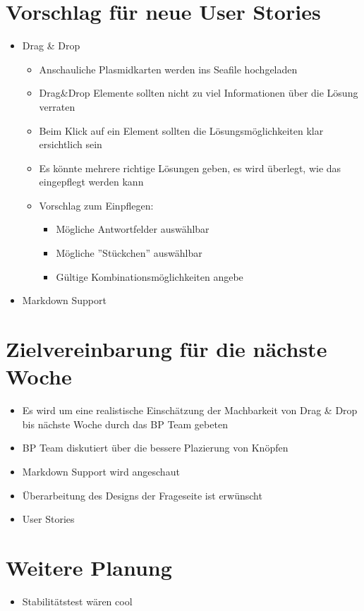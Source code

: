 \documentclass[colorback, accentcolor=tud1c, paper=a4]{tudexercise}
\begin{document}
\begin{multicols}{2}
\section{Vorschlag für neue User Stories}
\begin{itemize}
	\item Drag \& Drop
	\begin{itemize}
		\item Anschauliche Plasmidkarten werden ins Seafile hochgeladen
		\item Drag\&Drop Elemente sollten nicht zu viel Informationen über die Lösung verraten
		\item Beim Klick auf ein Element sollten die Lösungsmöglichkeiten klar ersichtlich sein
		\item Es könnte mehrere richtige Lösungen geben, es wird überlegt, wie das eingepflegt werden kann
		\item Vorschlag zum Einpflegen:
		\begin{itemize}
			\item Mögliche Antwortfelder auswählbar
			\item Mögliche ''Stückchen'' auswählbar
			\item Gültige Kombinationsmöglichkeiten angebe
		\end{itemize}
	\end{itemize}
	\item Markdown Support
\end{itemize}

\section{Zielvereinbarung für die nächste Woche}
\begin{itemize}
	\item Es wird um eine realistische Einschätzung der Machbarkeit von Drag \& Drop bis nächste Woche durch das BP Team gebeten
	\item BP Team diskutiert über die bessere Plazierung von Knöpfen
	\item Markdown Support wird angeschaut
	\item Überarbeitung des Designs der Frageseite ist erwünscht
	\item User Stories
\end{itemize}

\section{Weitere Planung}
\begin{itemize}
	\item Stabilitätstest wären cool
\end{itemize}

\end{multicols}
\end{document}
